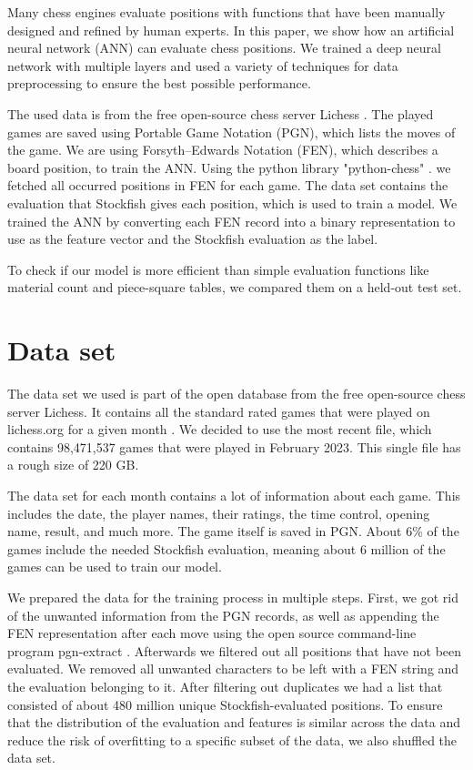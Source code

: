 \documentclass[conference]{IEEEtran}
\begin{document}
Many chess engines evaluate positions with functions that have been manually designed and refined by human experts. In this paper, we show how an artificial neural network (ANN) can evaluate chess positions. We trained a deep neural network with multiple layers and used a variety of techniques for data preprocessing to ensure the best possible performance.

The used data is from the free open-source chess server Lichess \cite{b2}. The played games are saved using Portable Game Notation (PGN), which lists the moves of the game. We are using Forsyth–Edwards Notation (FEN), which describes a board position, to train the ANN. Using the python library "python-chess" \cite{b3}. we fetched all occurred positions in FEN for each game. The data set contains the evaluation that Stockfish gives each position, which is used to train a model. We trained the ANN by converting each FEN record into a binary representation to use as the feature vector and the Stockfish evaluation as the label. 

To check if our model is more efficient than simple evaluation functions like material count and piece-square tables, we compared them on a held-out test set.

\section{Data set}\label{data set}
The data set we used is part of the open database from the free open-source chess server Lichess. It contains all the standard rated games that were played on lichess.org for a given month \cite{b2}. We decided to use the most recent file, which contains 98,471,537 games that were played in February 2023. This single file has a rough size of 220 GB.

The data set for each month contains a lot of information about each game. This includes the date, the player names, their ratings, the time control, opening name, result, and much more. The game itself is saved in PGN. About 6\% of the games include the needed Stockfish evaluation, meaning about 6 million of the games can be used to train our model.

We prepared the data for the training process in multiple steps. First, we got rid of the unwanted information from the PGN records, as well as appending the FEN representation after each move using the open source command-line program pgn-extract \cite{b4}. Afterwards we filtered out all positions that have not been evaluated. We removed all unwanted characters to be left with a FEN string and the evaluation belonging to it. After filtering out duplicates we had a list that consisted of about 480 million unique Stockfish-evaluated positions. To ensure that the distribution of the evaluation and features is similar across the data and reduce the risk of overfitting to a specific subset of the data, we also shuffled the data set.
\end{document}
